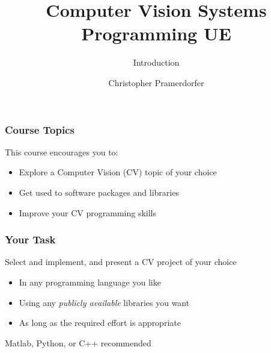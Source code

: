 \documentclass[xetex]{beamer}
\title{Computer Vision Systems Programming UE}
\subtitle{Introduction}
\author{Christopher Pramerdorfer}
\institute{Computer Vision Lab, Vienna University of Technology}
\begin{document}

\begin{frame}
\maketitle
\end{frame}


\begin{frame}
\frametitle{Course Topics}

This course encourages you to:
\begin{itemize}
	\item Explore a Computer Vision (CV) topic of your choice
	\item Get used to software packages and libraries
	\item Improve your CV programming skills
\end{itemize}

\end{frame}


\begin{frame}
\frametitle{Your Task}

Select and implement, and present a CV project of your choice
\begin{itemize}
	\item In any programming language you like
	\item Using any \emph{publicly available} libraries you want
	\item As long as the required effort is appropriate
\end{itemize}

\bigskip
Matlab, Python, or C++ recommended

\end{frame}

\end{document}
